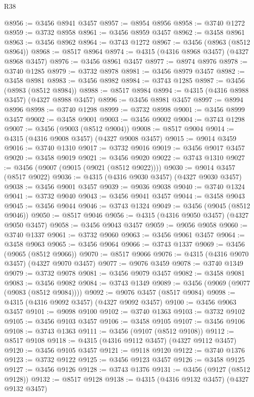 \begin{lexlean}{R38}
\begin{coremodule}
@8956 := @3456 @8941 @3457
@8957 := @8954 @8956
@8958 := @3740 @1272
@8959 := @3732 @8958
@8961 := @3456 @8959 @3457
@8962 := @3458 @8961
@8963 := @3456 @8962
@8964 := @3743 @1272
@8967 := @3456 (@8963 (@8512 @8964))
@8968 := @8517 @8964
@8974 := @4315 (@4316 @8968 @3457) (@4327 @8968 @3457)
@8976 := @3456 @8961 @3457
@8977 := @8974 @8976
@8978 := @3740 @1285
@8979 := @3732 @8978
@8981 := @3456 @8979 @3457
@8982 := @3458 @8981
@8983 := @3456 @8982
@8984 := @3743 @1285
@8987 := @3456 (@8983 (@8512 @8984))
@8988 := @8517 @8984
@8994 := @4315 (@4316 @8988 @3457) (@4327 @8988 @3457)
@8996 := @3456 @8981 @3457
@8997 := @8994 @8996
@8998 := @3740 @1298
@8999 := @3732 @8998
@9001 := @3456 @8999 @3457
@9002 := @3458 @9001
@9003 := @3456 @9002
@9004 := @3743 @1298
@9007 := @3456 (@9003 (@8512 @9004))
@9008 := @8517 @9004
@9014 := @4315 (@4316 @9008 @3457) (@4327 @9008 @3457)
@9015 := @9014 @3459
@9016 := @3740 @1310
@9017 := @3732 @9016
@9019 := @3456 @9017 @3457
@9020 := @3458 @9019
@9021 := @3456 @9020
@9022 := @3743 @1310
@9027 := @3456 (@9007 (@9015 (@9021 (@8512 @9022))))
@9030 := @9014 @3457 (@8517 @9022)
@9036 := @4315 (@4316 @9030 @3457) (@4327 @9030 @3457)
@9038 := @3456 @9001 @3457
@9039 := @9036 @9038
@9040 := @3740 @1324
@9041 := @3732 @9040
@9043 := @3456 @9041 @3457
@9044 := @3458 @9043
@9045 := @3456 @9044
@9046 := @3743 @1324
@9049 := @3456 (@9045 (@8512 @9046))
@9050 := @8517 @9046
@9056 := @4315 (@4316 @9050 @3457) (@4327 @9050 @3457)
@9058 := @3456 @9043 @3457
@9059 := @9056 @9058
@9060 := @3740 @1337
@9061 := @3732 @9060
@9063 := @3456 @9061 @3457
@9064 := @3458 @9063
@9065 := @3456 @9064
@9066 := @3743 @1337
@9069 := @3456 (@9065 (@8512 @9066))
@9070 := @8517 @9066
@9076 := @4315 (@4316 @9070 @3457) (@4327 @9070 @3457)
@9077 := @9076 @3459
@9078 := @3740 @1349
@9079 := @3732 @9078
@9081 := @3456 @9079 @3457
@9082 := @3458 @9081
@9083 := @3456 @9082
@9084 := @3743 @1349
@9089 := @3456 (@9069 (@9077 (@9083 (@8512 @9084))))
@9092 := @9076 @3457 (@8517 @9084)
@9098 := @4315 (@4316 @9092 @3457) (@4327 @9092 @3457)
@9100 := @3456 @9063 @3457
@9101 := @9098 @9100
@9102 := @3740 @1363
@9103 := @3732 @9102
@9105 := @3456 @9103 @3457
@9106 := @3458 @9105
@9107 := @3456 @9106
@9108 := @3743 @1363
@9111 := @3456 (@9107 (@8512 @9108))
@9112 := @8517 @9108
@9118 := @4315 (@4316 @9112 @3457) (@4327 @9112 @3457)
@9120 := @3456 @9105 @3457
@9121 := @9118 @9120
@9122 := @3740 @1376
@9123 := @3732 @9122
@9125 := @3456 @9123 @3457
@9126 := @3458 @9125
@9127 := @3456 @9126
@9128 := @3743 @1376
@9131 := @3456 (@9127 (@8512 @9128))
@9132 := @8517 @9128
@9138 := @4315 (@4316 @9132 @3457) (@4327 @9132 @3457)

\end{coremodule}
\end{lexlean}
